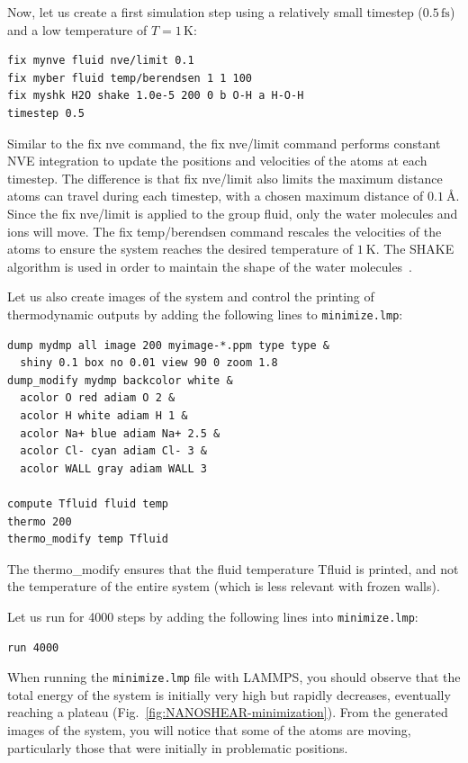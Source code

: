 \documentclass[9pt,tutorial]{livecoms}
\newcommand{\lmpcmd}[1]{\hspace{0pt}\colorbox{listing}{\textcolor{command}{\small{#1}}}\hspace{0pt}} %
\newcommand{\flecmd}[1]{\textcolor{command}{\texttt{#1}}} %
\begin{document}
Now, let us create a first simulation step using a relatively small
timestep ($0.5\,\text{fs}$) and a low temperature of $T = 1\,\text{K}$:
\begin{lstlisting}
fix mynve fluid nve/limit 0.1
fix myber fluid temp/berendsen 1 1 100
fix myshk H2O shake 1.0e-5 200 0 b O-H a H-O-H
timestep 0.5
\end{lstlisting}
Similar to the \lmpcmd{fix nve} command, the \lmpcmd{fix nve/limit} command performs constant
NVE integration to update the positions and velocities of the atoms at each
timestep.  The difference is that \lmpcmd{fix nve/limit} also limits the maximum
distance atoms can travel during each timestep, with a chosen maximum distance
of $0.1~\text{\AA{}}$.  Since the \lmpcmd{fix nve/limit} is applied to the
group \lmpcmd{fluid}, only the water molecules and ions will move.
The \lmpcmd{fix temp/berendsen} command rescales the velocities of the atoms
to ensure the system reaches the desired temperature of $1~\text{K}$.
The SHAKE algorithm is used in order to maintain
the shape of the water molecules~\cite{ryckaert1977numerical, andersen1983rattle}.

Let us also create images of the system and control
the printing of thermodynamic outputs by adding the following lines
to \flecmd{minimize.lmp}:
\begin{lstlisting}
dump mydmp all image 200 myimage-*.ppm type type &
  shiny 0.1 box no 0.01 view 90 0 zoom 1.8
dump_modify mydmp backcolor white &
  acolor O red adiam O 2 &
  acolor H white adiam H 1 &
  acolor Na+ blue adiam Na+ 2.5 &
  acolor Cl- cyan adiam Cl- 3 &
  acolor WALL gray adiam WALL 3

compute Tfluid fluid temp
thermo 200
thermo_modify temp Tfluid
\end{lstlisting}
The \lmpcmd{thermo\_modify} ensures that the fluid temperature \lmpcmd{Tfluid}
is printed, and not the temperature of the entire system (which is less relevant
with frozen walls).

Let us run for 4000 steps by adding the following lines into \flecmd{minimize.lmp}:
\begin{lstlisting}
run 4000
\end{lstlisting}
When running the \flecmd{minimize.lmp} file with LAMMPS, you should observe that the
total energy of the system is initially very high but rapidly decreases,
eventually reaching a plateau (Fig.~\ref{fig:NANOSHEAR-minimization}).  From the generated
images of the system, you will notice that some of the atoms are moving, particularly
those that were initially in problematic positions.
\end{document}
